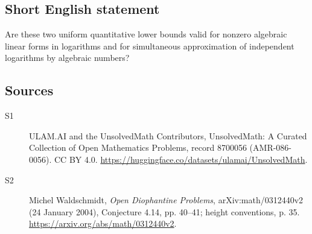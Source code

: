 \documentclass[11pt]{article}
\begin{document}
\subsection{Short English statement}
Are these two uniform quantitative lower bounds valid for nonzero algebraic linear forms in logarithms and for simultaneous approximation of independent logarithms by algebraic numbers?
\subsection{Sources}
\begin{description}
\item[\hypertarget{source:8700056:1}{S1}] ULAM.AI and the UnsolvedMath Contributors, UnsolvedMath: A Curated Collection of Open Mathematics Problems, record 8700056 (AMR-086-0056). CC BY 4.0. \url{https://huggingface.co/datasets/ulamai/UnsolvedMath}.
\item[\hypertarget{source:8700056:2}{S2}] Michel Waldschmidt, \emph{Open Diophantine Problems}, arXiv:math/0312440v2 (24 January 2004), Conjecture 4.14, pp. 40--41; height conventions, p. 35. \url{https://arxiv.org/abs/math/0312440v2}.
\end{description}
\label{end:8700056}
\end{document}
